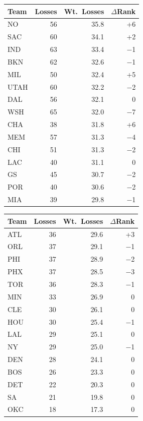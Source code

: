 \documentclass[11pt]{article}
\begin{document}
\begin{table}[H]
\centering
\begin{minipage}[t]{0.48\textwidth}
\centering
\begin{tabular}{lrrr}
\toprule
Team & Losses & Wt.\ Losses & $\Delta$Rank \\
\midrule
NO   & 56 & 35.8 & +6 \\
SAC  & 60 & 34.1 & +2 \\
IND  & 63 & 33.4 & $-$1 \\
BKN  & 62 & 32.6 & $-$1 \\
MIL  & 50 & 32.4 & +5 \\
UTAH & 60 & 32.2 & $-$2 \\
DAL  & 56 & 32.1 & 0 \\
WSH  & 65 & 32.0 & $-$7 \\
CHA  & 38 & 31.8 & +6 \\
MEM  & 57 & 31.3 & $-$4 \\
CHI  & 51 & 31.3 & $-$2 \\
LAC  & 40 & 31.1 & 0 \\
GS   & 45 & 30.7 & $-$2 \\
POR  & 40 & 30.6 & $-$2 \\
MIA  & 39 & 29.8 & $-$1 \\
\bottomrule
\end{tabular}
\end{minipage}%
\hfill
\begin{minipage}[t]{0.48\textwidth}
\centering
\begin{tabular}{lrrr}
\toprule
Team & Losses & Wt.\ Losses & $\Delta$Rank \\
\midrule
ATL  & 36 & 29.6 & +3 \\
ORL  & 37 & 29.1 & $-$1 \\
PHI  & 37 & 28.9 & $-$2 \\
PHX  & 37 & 28.5 & $-$3 \\
TOR  & 36 & 28.3 & $-$1 \\
MIN  & 33 & 26.9 & 0 \\
CLE  & 30 & 26.1 & 0 \\
HOU  & 30 & 25.4 & $-$1 \\
LAL  & 29 & 25.1 & 0 \\
NY   & 29 & 25.0 & $-$1 \\
DEN  & 28 & 24.1 & 0 \\
BOS  & 26 & 23.3 & 0 \\
DET  & 22 & 20.3 & 0 \\
SA   & 21 & 19.8 & 0 \\
OKC  & 18 & 17.3 & 0 \\
\bottomrule
\end{tabular}
\end{minipage}
\end{table}
\end{document}
